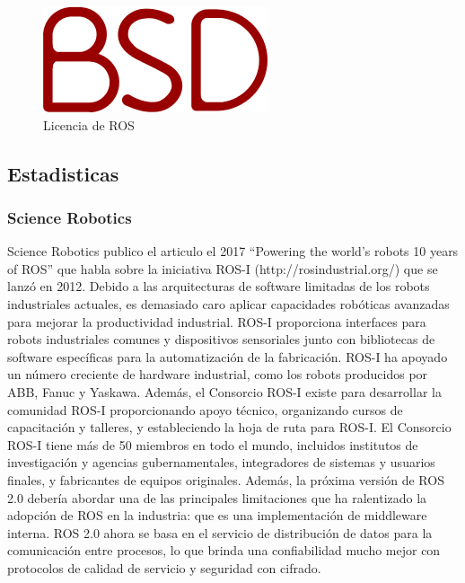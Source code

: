             \begin{figure}[htb]
                \centering
                \includegraphics[width=0.3\linewidth]{Main/Chapter3/Images3/3-5/licnecia-bsd-ros.png}
                \caption{Licencia de ROS}
                \label{f:Cap3-5_multilenguaje_ros}
            \end{figure}
            

\newpage

    \subsection{Estadisticas}
    
    \subsubsection{Science Robotics}
        Science Robotics publico el articulo el 2017 “Powering the world’s robots 10 years of ROS” que habla sobre la iniciativa ROS-I (http://rosindustrial.org/) que se lanzó en 2012. Debido a las arquitecturas de software limitadas de los robots industriales actuales, es demasiado caro aplicar capacidades robóticas avanzadas para mejorar la productividad industrial. ROS-I proporciona interfaces para robots industriales comunes y dispositivos sensoriales junto con bibliotecas de software específicas para la automatización de la fabricación. ROS-I ha apoyado un número creciente de hardware industrial, como los robots producidos por ABB, Fanuc y Yaskawa. Además, el Consorcio ROS-I existe para desarrollar la comunidad ROS-I proporcionando apoyo técnico, organizando cursos de capacitación y talleres, y estableciendo la hoja de ruta para ROS-I. El Consorcio ROS-I tiene más de 50 miembros en todo el mundo, incluidos institutos de investigación y agencias gubernamentales, integradores de sistemas y usuarios finales, y fabricantes de equipos originales. Además, la próxima versión de ROS 2.0 debería abordar una de las principales limitaciones que ha ralentizado la adopción de ROS en la industria: que es una implementación de middleware interna. ROS 2.0 ahora se basa en el servicio de distribución de datos para la comunicación entre procesos, lo que brinda una confiabilidad mucho mejor con protocolos de calidad de servicio y seguridad con cifrado.

